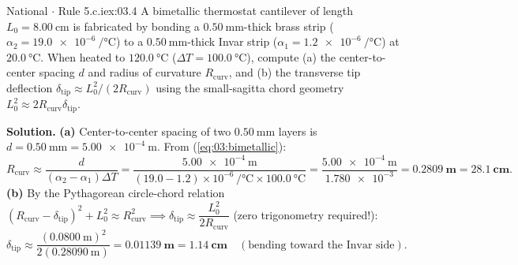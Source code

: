 \begin{workedexample}{National $\cdot$ Rule 5.c.i}{ex:03.4}
A bimetallic thermostat cantilever of length $L_0 = \SI{8.00}{\centi\meter}$ is fabricated by bonding a $\SI{0.50}{\milli\meter}$-thick brass strip ($\alpha_2 = \SI{19.0e-6}{\per\celsius}$) to a $\SI{0.50}{\milli\meter}$-thick Invar strip ($\alpha_1 = \SI{1.2e-6}{\per\celsius}$) at $\SI{20.0}{\celsius}$. When heated to $\SI{120.0}{\celsius}$ ($\Delta T = \SI{100.0}{\celsius}$), compute (a) the center-to-center spacing $d$ and radius of curvature $R_{\mathrm{curv}}$, and (b) the transverse tip deflection $\delta_{\mathrm{tip}} \approx L_0^2 / (2R_{\mathrm{curv}})$ using the small-sagitta chord geometry $L_0^2 \approx 2R_{\mathrm{curv}}\delta_{\mathrm{tip}}$.

\textbf{Solution.}
\textbf{(a)} Center-to-center spacing of two $\SI{0.50}{\milli\meter}$ layers is $d = \SI{0.50}{\milli\meter} = \SI{5.00e-4}{\meter}$. From (\ref{eq:03:bimetallic}):
\[
  R_{\mathrm{curv}} \approx \frac{d}{(\alpha_2 - \alpha_1)\Delta T} = \frac{\SI{5.00e-4}{\meter}}{(19.0 - 1.2)\times 10^{-6}\,\si{\per\celsius} \times \SI{100.0}{\celsius}} = \frac{\SI{5.00e-4}{\meter}}{\num{1.780e-3}} = \mathbf{\SI{0.2809}{\meter} = \SI{28.1}{\centi\meter}}.
\]
\textbf{(b)} By the Pythagorean circle-chord relation $(R_{\mathrm{curv}} - \delta_{\mathrm{tip}})^2 + L_0^2 \approx R_{\mathrm{curv}}^2 \implies \delta_{\mathrm{tip}} \approx \dfrac{L_0^2}{2R_{\mathrm{curv}}}$ (zero trigonometry required!):
\[
  \delta_{\mathrm{tip}} \approx \frac{(\SI{0.0800}{\meter})^2}{2(\SI{0.28090}{\meter})} = \mathbf{\SI{0.01139}{\meter} = \SI{1.14}{\centi\meter}} \quad (\text{bending toward the Invar side}).
\]
\end{workedexample}

